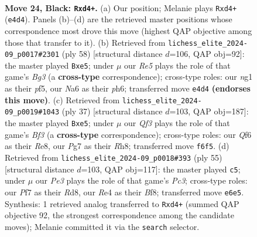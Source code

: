 \documentclass[11pt]{article}
\begin{document}
\clearpage

\begin{figure}[p]\centering
\begin{subfigure}{0.46\textwidth}\centering
\resizebox{\linewidth}{!}{%
\newchessgame
\chessboard[
  setfen={r1b2k2/pp3pp1/n3pq2/3p4/3Nr3/PPQ5/6PP/R2K2NR b - - 0 24},
  showmover=false,
  pgfstyle=straightmove, color=movearrow, markmove={e4-d4}
]}
\caption{}
\end{subfigure}\hfill
\begin{subfigure}{0.46\textwidth}\centering
\resizebox{\linewidth}{!}{%
\newchessgame
\chessboard[
  setfen={4r1k1/6p1/2q4p/1p2np2/8/2P2PB1/RP2QPKP/8 w - - 0 30},
  showmover=false,
  pgfstyle=straightmove, color=movearrow, markmove={g3-e5}
]}
\caption{}
\end{subfigure}
\\[4pt]
\begin{subfigure}{0.46\textwidth}\centering
\resizebox{\linewidth}{!}{%
\newchessgame
\chessboard[
  setfen={4rk1r/p1q2p1p/1p3bp1/2pRN3/2P5/2Q5/PP3PPP/2K1R3 b - - 4 19},
  showmover=false,
  pgfstyle=straightmove, color=movearrow, markmove={f6-e5}
]}
\caption{}
\end{subfigure}\hfill
\begin{subfigure}{0.46\textwidth}\centering
\resizebox{\linewidth}{!}{%
\newchessgame
\chessboard[
  setfen={3r1bk1/p4pp1/Pqp4p/1p1p4/3N4/5P1P/1PPQ2P1/4R1K1 b - - 0 28},
  showmover=false,
  pgfstyle=straightmove, color=movearrow, markmove={c6-c5}
]}
\caption{}
\end{subfigure}
\caption{\textbf{Move 24, Black: \texttt{Rxd4+}.} (a) Our position; Melanie plays \texttt{Rxd4+} (\texttt{e4d4}). Panels (b)--(d) are the retrieved master positions whose correspondence most drove this move (highest QAP objective among those that transfer to it). (b) Retrieved from \texttt{lichess\_elite\_2024-09\_p0017\#2301} (ply 58) [structural distance $d$=106, QAP obj=92]: the master played \texttt{Bxe5}; under $\mu$ our \emph{Re5} plays the role of that game's \emph{Bg3} (a \textbf{cross-type} correspondence); cross-type roles: our \emph{n}g1 as their \emph{p}f5, our \emph{N}a6 as their \emph{p}h6; transferred move \texttt{e4d4} \textbf{(endorses this move)}. (c) Retrieved from \texttt{lichess\_elite\_2024-09\_p0019\#1043} (ply 37) [structural distance $d$=103, QAP obj=187]: the master played \texttt{Bxe5}; under $\mu$ our \emph{Qf3} plays the role of that game's \emph{Bf3} (a \textbf{cross-type} correspondence); cross-type roles: our \emph{Q}f6 as their \emph{R}e8, our \emph{P}g7 as their \emph{R}h8; transferred move \texttt{f6f5}. (d) Retrieved from \texttt{lichess\_elite\_2024-09\_p0018\#393} (ply 55) [structural distance $d$=103, QAP obj=117]: the master played \texttt{c5}; under $\mu$ our \emph{Pe3} plays the role of that game's \emph{Pc3}; cross-type roles: our \emph{P}f7 as their \emph{R}d8, our \emph{R}e4 as their \emph{B}f8; transferred move \texttt{e6e5}. Synthesis: 1 retrieved analog transferred to \texttt{Rxd4+} (summed QAP objective 92, the strongest correspondence among the candidate moves); Melanie committed it via the \texttt{search} selector.}
\label{fig:thought-m47}
\end{figure}
\end{document}
